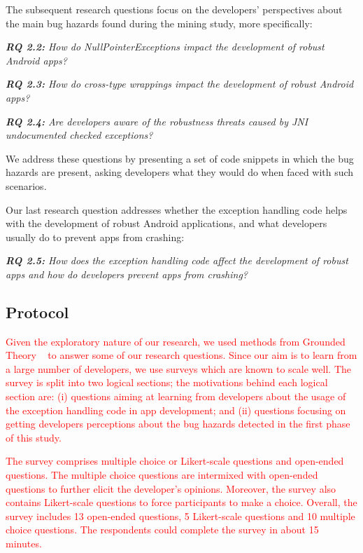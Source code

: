 The subsequent research questions focus on the developers' perspectives about the main bug hazards found during the mining study, more specifically:

\emph{\textbf{RQ 2.2:} How do NullPointerExceptions impact the development of robust Android apps?}

\emph{\textbf{RQ 2.3:} How do cross-type wrappings impact the development of robust Android apps?}

\emph{\textbf{RQ 2.4:} Are developers aware of the robustness threats caused by JNI undocumented checked exceptions?}

We address these questions by presenting a set of code snippets in which the bug hazards are present, asking developers what they would do when faced with such scenarios. 

Our last research question addresses
whether the exception handling code helps with the development of robust Android applications, and what developers usually do to prevent apps from crashing:

\emph{\textbf{RQ 2.5:} How does the exception handling code affect the development of robust apps and how do developers prevent apps from crashing?}

\subsection{Protocol}


\textcolor{red}{Given the exploratory nature of our research, we used methods from Grounded Theory ~\cite{charmaz2006} to answer some of our research questions. Since our aim is to learn from a large number of developers, we use surveys which are known to scale well. The survey is split into two logical sections; the motivations behind each logical section are: (i) questions aiming at learning from developers about the usage of the exception handling code in app development;  and (ii) questions focusing on getting developers perceptions about the bug hazards detected in the first phase of this study.}

\textcolor{red}{The survey comprises multiple choice or Likert-scale questions and open-ended questions. The multiple choice questions are intermixed with open-ended questions to further elicit the developer's opinions. Moreover, the survey also contains Likert-scale questions to force participants to make a choice. Overall, the survey includes 13 open-ended questions, 5 Likert-scale questions and 10 multiple choice questions. The respondents could complete the survey in about 15 minutes.}

